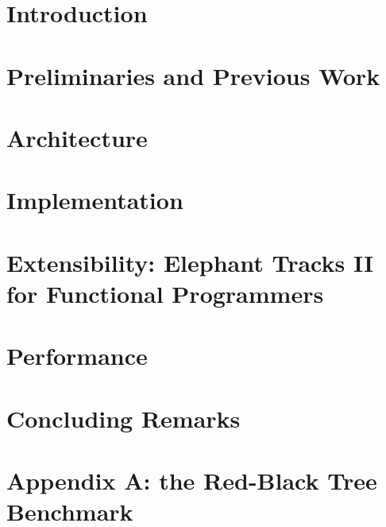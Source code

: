 \documentclass[12pt]{report}
\begin{document}
\setcounter{page}{0}
\chapter{Introduction}


\chapter{Preliminaries and Previous Work}


\chapter{Architecture}


\chapter{Implementation}
\chapter{Extensibility: Elephant Tracks II for Functional Programmers}
\chapter{Performance}
\chapter{Concluding Remarks}


\chapter*{Appendix A: the Red-Black Tree Benchmark}




\end{document}
